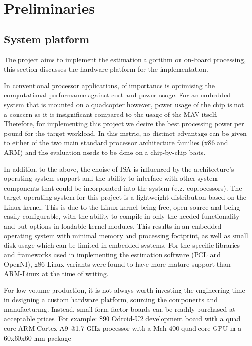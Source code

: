 \documentclass[]{article}
\begin{document}
{\section{Preliminaries}

\subsection{System platform} %
\label{sub:system_platform}

The project aims to implement the estimation algorithm on on-board processing, this section discusses the hardware platform for the implementation.

In conventional processor applications, of importance is optimising the computational performance against cost and power usage. For an embedded system that is mounted on a quadcopter however, power usage of the chip is not a concern as it is insignificant compared to the usage of the MAV itself. Therefore, for implementing this project we desire the best processing power per pound for the target workload. In this metric, no distinct advantage can be given to either of the two main standard processor architecture families (x86 and ARM) and the evaluation needs to be done on a chip-by-chip basis. 

In addition to the above, the choise of ISA is influenced by the architecture's operating system support and the ability to interface with other system components that could be incorporated into the system (e.g. coprocessors). The target operating system for this project is a lightweight distribution based on the Linux kernel. This is due to the Linux kernel being free, open source and being easily configurable, with the ability to compile in only the needed functionality and put options in loadable kernel modules. This results in an embedded operating system with minimal memory and processing footprint, as well as small disk usage which can be limited in embedded systems. For the specific libraries and frameworks used in implementing the estimation software (PCL and OpenNI), x86-Linux variants were found to have more mature support than ARM-Linux at the time of writing.

For low volume production, it is not always worth investing the engineering time in designing a custom hardware platform, sourcing the components and manufacturing. Instead, small form factor boards can be readily purchased at acceptable prices. For example: \$90 Odroid-U2 development board with a quad core ARM Cortex-A9 @1.7 GHz processor with a Mali-400 quad core GPU in a 60x60x60 mm package.

}
\end{document}
